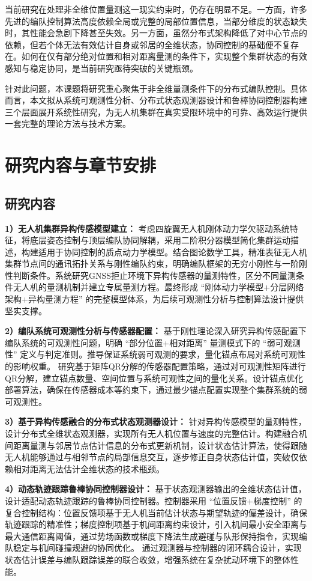 当前研究在处理非全维位置量测这一现实约束时，仍存在明显不足。一方面，许多先进的编队控制算法高度依赖全局或完整的局部位置信息，当部分维度的状态缺失时，其性能会急剧下降甚至失效。另一方面，虽然分布式架构降低了对中心节点的依赖，但若个体无法有效估计自身或邻居的全维状态，协同控制的基础便不复存在。如何在仅有部分绝对位置和相对距离量测的条件下，实现整个集群状态的有效感知与稳定协同，是当前研究亟待突破的关键瓶颈。

针对此问题，本课题将研究重心聚焦于非全维量测条件下的分布式编队控制。具体而言，本文拟从系统可观测性分析、分布式状态观测器设计和鲁棒协同控制器构建三个层面展开系统性研究，为无人机集群在真实受限环境中的可靠、高效运行提供一套完整的理论方法与技术方案。
\section{研究内容与章节安排}

\subsection{研究内容}
\textbf{1）无人机集群异构传感模型建立：}
考虑四旋翼无人机刚体动力学欠驱动系统特征，将底层姿态控制与顶层编队协同解耦，采用二阶积分器模型简化集群运动描述，构建适用于协同控制的质点动力学模型。结合图论数学工具，精准表征无人机集群节点间的通讯拓扑关系与刚性编队约束，明确编队框架的无穷小刚性与一阶刚性判断条件。系统研究GNSS拒止环境下异构传感器的量测特性，区分不同量测条件无人机的量测机制并建立专属量测方程。最终形成 “刚体动力学模型+分层网络架构+异构量测方程” 的完整模型体系，为后续可观测性分析与控制算法设计提供坚实支撑。

\textbf{2）编队系统可观测性分析与传感器配置：}
基于刚性理论深入研究异构传感配置下编队系统的可观测性问题，明确 “部分位置+相对距离” 量测模式下的 “弱可观测性” 定义与判定准则。推导保证系统弱可观测的要求，量化锚点布局对系统可观性的影响权重。
研究基于矩阵QR分解的传感器配置策略，通过对可观测性矩阵进行QR分解，建立锚点数量、空间位置与系统可观性之间的量化关系。设计锚点优化部署算法，确保在传感器成本等约束下，通过最少锚点配置实现整个集群系统的弱可观测性。

\textbf{3）基于异构传感融合的分布式状态观测器设计：}
针对异构传感模型的量测特性，设计分布式全维状态观测器，实现所有无人机位置与速度的完整估计。构建融合机间距离量测与邻居节点估计信息的分布式更新机制，设计状态估计算法，使得跟随无人机能够通过与相邻节点的局部信息交互，逐步修正自身状态估计值，突破仅依赖相对距离无法估计全维状态的技术瓶颈。

\textbf{4）动态轨迹跟踪鲁棒协同控制器设计：}
基于状态观测器输出的全维状态估计值，设计适配动态轨迹跟踪的鲁棒协同控制器。控制器采用 “位置反馈+梯度控制” 的复合控制结构：位置反馈项基于无人机当前估计状态与期望轨迹的偏差设计，确保轨迹跟踪的精准性；梯度控制项基于机间距离约束设计，引入机间最小安全距离与最大通信距离阈值，通过势场函数或梯度下降法生成避碰与队形保持指令，实现编队稳定与机间碰撞规避的协同优化。
通过观测器与控制器的闭环耦合设计，实现状态估计误差与编队跟踪误差的联合收敛，增强系统在复杂扰动环境下的整体性能。

